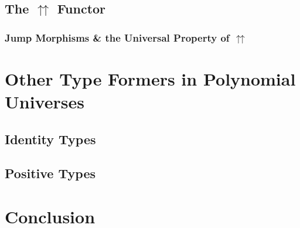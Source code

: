 \documentclass[
  11pt,
  oneside,
  article]{memoir}
\theoremstyle{definition}
\theoremstyle{plain}
\newcommand{\0}{\textsf{0}}
\newcommand{\1}{\tn{\textsf{1}}}
\begin{document}
\section{\texorpdfstring{The \(\upuparrows\)
Functor}{The \textbackslash upuparrows Functor}}\label{the-upuparrows-functor}

\subsection{\texorpdfstring{Jump Morphisms \& the Universal Property of
\(\upuparrows\)}{Jump Morphisms \& the Universal Property of \textbackslash upuparrows}}\label{jump-morphisms-the-universal-property-of-upuparrows}

\chapter{Other Type Formers in Polynomial
Universes}\label{other-type-formers-in-polynomial-universes}

\section{Identity Types}\label{identity-types}

\section{Positive Types}\label{positive-types}

\chapter{Conclusion}\label{conclusion}

\makeatletter
{}
\makeatother
\end{document}
